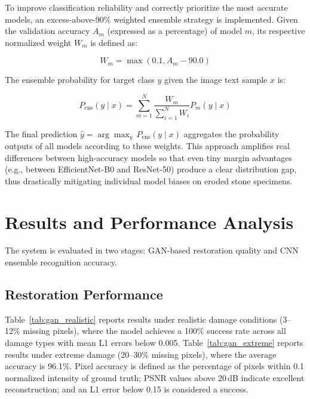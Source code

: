 \documentclass[conference]{IEEEtran}
\begin{document}
To improve classification reliability and correctly prioritize the most accurate models, an excess-above-90\% weighted ensemble strategy is implemented. Given the validation accuracy $A_m$ (expressed as a percentage) of model $m$, its respective normalized weight $W_m$ is defined as:

\begin{equation}
W_m = \max(0.1, A_m - 90.0)
\end{equation}

The ensemble probability for target class $y$ given the image text sample $x$ is:

\begin{equation}
P_{\text{ens}}(y \mid x) = \sum_{m=1}^{N} \frac{W_m}{\sum_{i=1}^{N} W_i} P_m(y \mid x)
\end{equation}

The final prediction $\hat{y} = \arg\max_y\, P_{\text{ens}}(y \mid x)$ aggregates the probability outputs of all models according to these weights. This approach amplifies real differences between high-accuracy models so that even tiny margin advantages (e.g., between EfficientNet-B0 and ResNet-50) produce a clear distribution gap, thus drastically mitigating individual model biases on eroded stone specimens.

\section{Results and Performance Analysis}

The system is evaluated in two stages: GAN-based restoration quality and CNN ensemble recognition accuracy.

\subsection{Restoration Performance}

Table~\ref{tab:gan_realistic} reports results under realistic damage conditions (3--12\% missing pixels), where the model achieves a 100\% success rate across all damage types with mean L1 errors below 0.005. Table~\ref{tab:gan_extreme} reports results under extreme damage (20--30\% missing pixels), where the average accuracy is 96.1\%. Pixel accuracy is defined as the percentage of pixels within 0.1 normalized intensity of ground truth; PSNR values above 20\,dB indicate excellent reconstruction; and an L1 error below 0.15 is considered a success.
\end{document}

